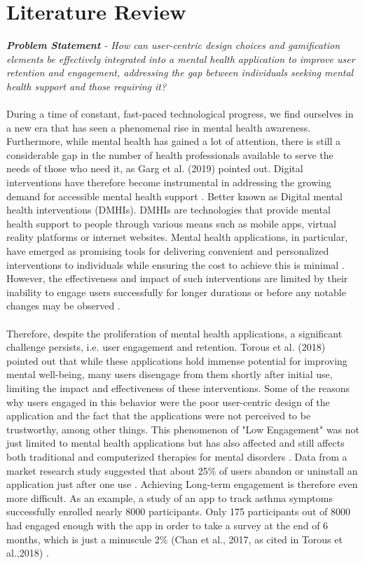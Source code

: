\documentclass[manuscript,screen,review]{acmart}
\begin{document}
\section{Literature Review}
\textit{\textbf{Problem Statement} - How can user-centric design choices and gamification elements be effectively integrated into a mental health application to improve user retention and engagement, addressing the gap between individuals seeking mental health support and those requiring it?}
\\\\
During a time of constant, fast-paced technological progress, we find ourselves in a new era that has seen a phenomenal rise in mental health awareness. Furthermore, while mental health has gained a lot of attention, there is still a considerable gap in the number of health professionals available to serve the needs of those who need it, as Garg et al. \cite{Garg19} (2019) pointed out. Digital interventions have therefore become instrumental in addressing the growing demand for accessible mental health support \cite{Borghouts21}. Better known as Digital mental health interventions (DMHIs). DMHIs are technologies that provide mental health support to people through various means such as mobile apps, virtual reality platforms or internet websites. Mental health applications, in particular, have emerged as promising tools for delivering convenient and personalized interventions to individuals while ensuring the cost to achieve this is minimal  \cite{Baumel19}. However, the effectiveness and impact of such interventions are limited by their inability to engage users successfully for longer durations or before any notable changes may be observed \cite{Eysenbach05, Christensen06}.
\\ \\
Therefore, despite the proliferation of mental health applications, a significant challenge persists, i.e. user engagement and retention. Torous et al. \cite{Torous18} (2018) pointed out that while these applications hold immense potential for improving mental well-being, many users disengage from them shortly after initial use, limiting the impact and effectiveness of these interventions. Some of the reasons why users engaged in this behavior were the poor user-centric design of the application and the fact that the applications were not perceived to be trustworthy, among other things. This phenomenon of "Low Engagement" was not just limited to mental health applications but has also affected and still affects both traditional and computerized therapies for mental disorders \cite{Torous18}. Data from a market research study suggested that about 25\% of users abandon or uninstall an application just after one use \cite{AppUninstall}. Achieving Long-term engagement is therefore even more difficult. As an example, a study of an app to track asthma symptoms successfully enrolled nearly 8000 participants. Only 175 participants out of 8000 had engaged enough with the app in order to take a survey at the end of 6 months, which is just a minuscule 2\% (Chan et al., 2017, as cited in Torous et al.,2018) \cite{Torous18}.
\end{document}
